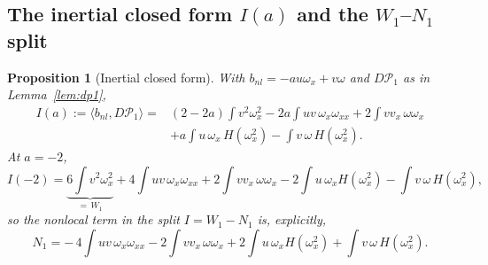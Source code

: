 \documentclass[11pt]{article}
\newtheorem{proposition}[theorem]{Proposition}
\theoremstyle{remark}
\theoremstyle{plain}
\newcommand{\eqdef}{:=}
\begin{document}
\subsection{The inertial closed form $I(a)$ and the $W_1$--$N_1$ split}

\begin{proposition}[Inertial closed form]\label{prop:Ia}
With $b_{nl} = -a u\omega_x + v\omega$ and $D\mathcal{P}_1$ as in Lemma~\ref{lem:dp1},
\begin{equation}
\begin{aligned}
   I(a) \eqdef \langle b_{nl}, D\mathcal{P}_1\rangle
   = {}& (2-2a)\int v^2\omega_x^2 - 2a\int uv\,\omega_x\omega_{xx} + 2\int v v_x\,\omega\omega_x \\
   & + a\int u\,\omega_x\, H(\omega_x^2) - \int v\,\omega\, H(\omega_x^2) .
\end{aligned}
\end{equation}
At $a = -2$,
\begin{equation}
  I(-2) = \underbrace{6\int v^2\omega_x^2}_{=\,W_1} + 4\int uv\,\omega_x\omega_{xx}
  + 2\int v v_x\,\omega\omega_x - 2\int u\,\omega_x H(\omega_x^2) - \int v\,\omega\, H(\omega_x^2),
\end{equation}
so the nonlocal term in the split $I = W_1 - N_1$ is, explicitly,
\begin{equation}
  N_1 = -\,4\int uv\,\omega_x\omega_{xx} - 2\int v v_x\,\omega\omega_x
  + 2\int u\,\omega_x H(\omega_x^2) + \int v\,\omega\, H(\omega_x^2) .
\end{equation}
\end{proposition}
\end{document}
